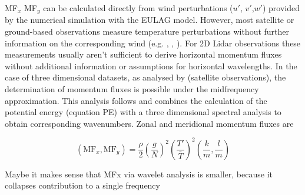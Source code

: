 MF$_x$ MF$_y$ can be calculated directly from wind perturbations ($u'$, $v'$,$w'$) provided by the numerical simulation with the EULAG model. However, most satellite or ground-based observations measure temperature perturbations without further information on the corresponding wind (e.g. \cite{hindley_gravity_2019}, \cite{kaifler_compact_2021}, \cite{wu_satellite_1996}). For 2D Lidar observations these measurements usually aren't sufficient to derive horizontal momentum fluxes without additional information or assumptions for horizontal wavelengths. In the case of three dimensional datasets, as analysed by \textcite{hindley_18year_2020} (satellite observations), the determination of momentum fluxes is possible under the midfrequency approximation. This analysis follows \textcite{ern...} and combines the calculation of the potential energy (equation PE) with a three dimensional spectral analysis to obtain corresponding wavenumbers. Zonal and meridional momentum fluxes are 

\begin{equation}
    (\mathrm{MF}_x, \mathrm{MF}_y) = \frac{\rho}{2} (\frac{g}{N})^2 (\frac{T'}{\bar{T}})^2 (\frac{k}{m},\frac{l}{m})
\end{equation}


Maybe it makes sense that MFx via wavelet analysis is smaller, because it collapses contribution to a single frequency

